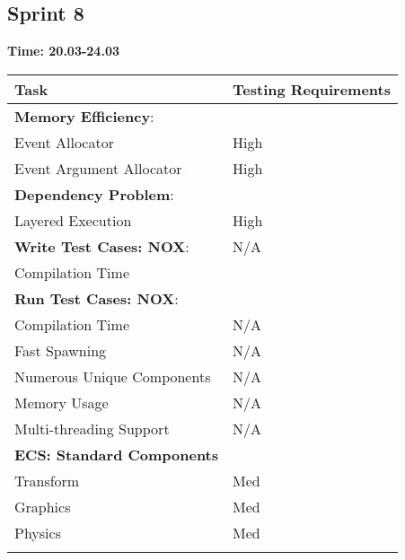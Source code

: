 \documentclass[hidelinks]{article}
\begin{document}
\subsection{Sprint 8}
\textbf{Time: 20.03-24.03}\\
\begin{tabularx}{\textwidth}{l >{\centering\arraybackslash}X}
\hline\noalign{\smallskip}
  Task                              & Testing Requirements   \\
\hline\noalign{\smallskip}
  \textbf{Memory Efficiency}:       &                        \\
  Event Allocator                   & High                   \\
  Event Argument Allocator          & High                   \\
  
  \textbf{Dependency Problem}:      &                        \\ 
  Layered Execution                 & High                   \\

  \textbf{Write Test Cases: NOX}:   & N/A                    \\
  Compilation Time                                           \\

  \textbf{Run Test Cases: NOX}:     &                        \\
  Compilation Time                  & N/A                    \\
  Fast Spawning                     & N/A                    \\
  Numerous Unique Components        & N/A                    \\
  Memory Usage                      & N/A                    \\
  Multi-threading Support           & N/A                    \\

  \textbf{ECS: Standard Components} &                        \\
  Transform                         & Med                    \\
  Graphics                          & Med                    \\
  Physics                           & Med                    \\

\hline\noalign{\smallskip}
\end{tabularx}
\end{document}
